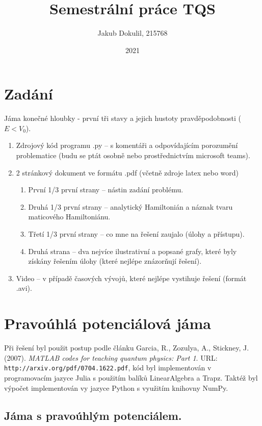 \documentclass[12pt, a4paper]{article}
\author{Jakub Dokulil, 215768}
\title{Semestrální práce TQS}
\date{2021}
\begin{document}
\maketitle

\section*{Zadání}

Jáma konečné hloubky - první tři stavy a jejich hustoty pravděpodobnosti ($E<V_0$).
\begin{enumerate} 
    \item Zdrojový kód programu .py – s komentáři a odpovídajícím porozumění problematice (budu se ptát osobně nebo prostřednictvím microsoft teams).
    \item 2 stránkový dokument ve formátu .pdf (včetně zdroje latex nebo word)\begin{enumerate}
        \item První 1/3 první strany – nástin zadání problému.
        \item Druhá 1/3 první strany – analytický Hamiltonián a náznak tvaru maticového Hamiltoniánu.
        \item Třetí 1/3 první strany – co mne na řešení zaujalo (úlohy a přístupu).
        \item Druhá strana – dva nejvíce ilustrativní a popsané grafy, které byly získány řešením úlohy (které nejlépe znázorňují řešení).
    \end{enumerate}
    \item Video – v případě časových vývojů, které nejlépe vystihuje řešení (formát .avi).
\end{enumerate}

\section*{Pravoúhlá potenciálová jáma}

Při řešení byl použit postup podle článku Garcia, R., Zozulya, A., Stickney, J. (2007). \textit{MATLAB codes for teaching quantum physics: Part 1}. URL: \texttt{http://arxiv.org/pdf/0704.1622.pdf}, kód byl implementován v programovacím jazyce Julia  s použitím balíků LinearAlgebra a Trapz. Taktéž byl výpočet implementován vy jazyce Python s využitím knihovny NumPy.

\subsection*{Jáma s pravoúhlým potenciálem.}
\end{document}

